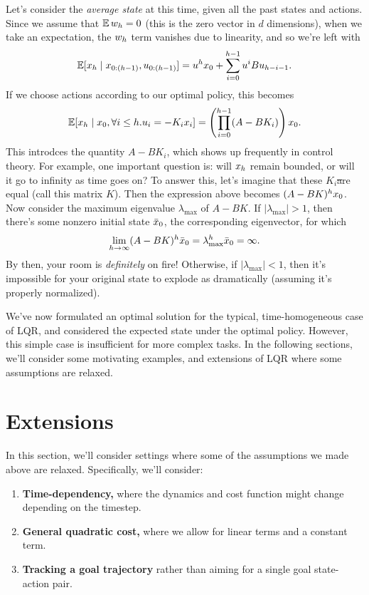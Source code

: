 \documentclass[../main/main]{subfiles}
\begin{document}
Let's consider the \emph{average state} at this time, given all the past states and actions.
Since we assume that $\operatorname*{\mathbb{E}} w_h = 0$ (this is the zero vector in $d$ dimensions),
when we take an expectation, the $w_h$ term vanishes due to linearity, and so we're left with \[
    \operatorname*{\mathbb{E}} [x_h \mid x_{0:(h-1)}, u_{0:(h-1)}] = u^h x_0 + \sum_{i=0}^{h-1} u^i B u_{h-i-1}.
\]
If we choose actions according to our optimal policy, this becomes \[
    \operatorname*{\mathbb{E}} [x_h \mid x_0, \forall i \le h . u_i = - K_i x_i] = \left( \prod_{i=0}^{h-1} (A - B K_i) \right) x_0.
\]
This introdces the quantity $A - B K_i$, which shows up frequently in control theory.
For example, one important question is: will $x_h$ remain bounded,
or will it go to infinity as time goes on?
To answer this, let's imagine that these $K_i$\st are equal (call this matrix $K$).
Then the expression above becomes $(A-BK)^h x_0$.
Now consider the maximum eigenvalue $\lambda_{\max}$ of $A - BK$.
If $|\lambda_{\max}| > 1$, then there's some nonzero initial state $\bar {x}_0$, the corresponding eigenvector, for which \[
    \lim_{h \to \infty} (A - BK)^h \bar {x}_0 = \lambda_{\max}^h \bar {x}_0 = \infty.
\]
By then, your room is \emph{definitely} on fire! Otherwise, if $|\lambda_{\max}| < 1$, then it's impossible for your original state to explode as dramatically (assuming it's properly normalized).

We've now formulated an optimal solution for the typical, time-homogeneous case of LQR, and considered the expected state under the optimal policy.
However, this simple case is insufficient for more complex tasks.
In the following sections, we'll consider some motivating examples, and extensions of LQR where some assumptions are relaxed.

\section{Extensions}

In this section, we'll consider settings where some of the assumptions we made above are relaxed.
Specifically, we'll consider:
\begin{enumerate}
    \item \textbf{Time-dependency,} where the dynamics and cost function might change depending on the timestep.
    \item \textbf{General quadratic cost,} where we allow for linear terms and a constant term.
    \item \textbf{Tracking a goal trajectory} rather than aiming for a single goal state-action pair.
\end{enumerate}
\end{document}

